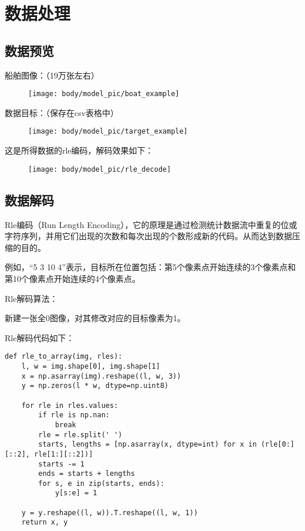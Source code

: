
\chapter{数据处理}

\section{数据预览}

船舶图像：（19万张左右）

\begin{figure}
\centering
\texttt{[image: body/model\_pic/boat\_example]}
\caption{}
\end{figure}

数据目标：（保存在csv表格中）

\begin{figure}
\centering
\texttt{[image: body/model\_pic/target\_example]}
\caption{}
\end{figure}

这是所得数据的rle编码，解码效果如下：

\begin{figure}
\centering
\texttt{[image: body/model\_pic/rle\_decode]}
\caption{}
\end{figure}

\section{数据解码}

Rle编码（Run Length
Encoding），它的原理是通过检测统计数据流中重复的位或字符序列，并用它们出现的次数和每次出现的个数形成新的代码。从而达到数据压缩的目的。

例如，``5 3 10
4''表示，目标所在位置包括：第5个像素点开始连续的3个像素点和第10个像素点开始连续的4个像素点。

Rle解码算法：

新建一张全0图像，对其修改对应的目标像素为1。

Rle解码代码如下：

\begin{verbatim}
def rle_to_array(img, rles):
    l, w = img.shape[0], img.shape[1]
    x = np.asarray(img).reshape((l, w, 3))
    y = np.zeros(l * w, dtype=np.uint8)

    for rle in rles.values:
        if rle is np.nan:
            break
        rle = rle.split(' ')
        starts, lengths = [np.asarray(x, dtype=int) for x in (rle[0:][::2], rle[1:][::2])]
        starts -= 1
        ends = starts + lengths
        for s, e in zip(starts, ends):
            y[s:e] = 1

    y = y.reshape((l, w)).T.reshape((l, w, 1))
    return x, y
\end{verbatim}

